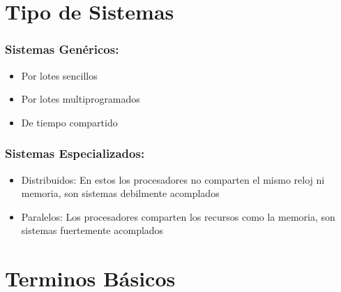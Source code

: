 \documentclass[12pt, fleqn]{report}                             %
\begin{document}
        \section{Tipo de Sistemas}

            \subsubsection{Sistemas Genéricos:}
            \begin{itemize}
                \item Por lotes sencillos
                \item Por lotes multiprogramados
                \item De tiempo compartido
            \end{itemize}

            \subsubsection{Sistemas Especializados:}
            \begin{itemize}
                \item Distribuidos: En estos los procesadores no comparten el mismo reloj ni memoria, son sistemas
                    debilmente acomplados
                \item Paralelos: Los procesadores comparten los recursos como la memoria, son sistemas fuertemente
                    acomplados
            \end{itemize}     

        \clearpage
        \section{Terminos Básicos}
\end{document}
